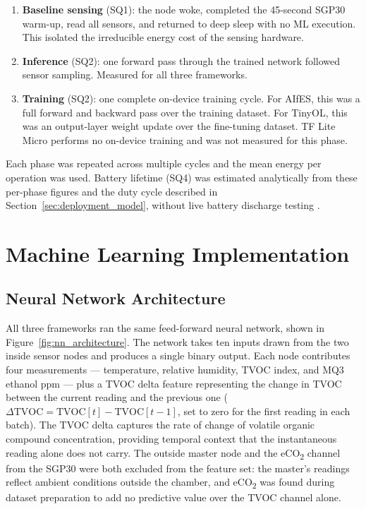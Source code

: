 \begin{enumerate}
    \item \textbf{Baseline sensing} (SQ1): the node woke, completed the 45-second SGP30 warm-up, read all sensors, and returned to deep sleep with no ML execution. This isolated the irreducible energy cost of the sensing hardware.
    \item \textbf{Inference} (SQ2): one forward pass through the trained network followed sensor sampling. Measured for all three frameworks.
    \item \textbf{Training} (SQ2): one complete on-device training cycle. For AIfES, this was a full forward and backward pass over the training dataset. For TinyOL, this was an output-layer weight update over the fine-tuning dataset. TF Lite Micro performs no on-device training and was not measured for this phase.
\end{enumerate}

Each phase was repeated across multiple cycles and the mean energy per operation was used. Battery lifetime (SQ4) was estimated analytically from these per-phase figures and the duty cycle described in Section~\ref{sec:deployment_model}, without live battery discharge testing \cite{Rodrigues2017}.

\section{Machine Learning Implementation}

\subsection{Neural Network Architecture}

All three frameworks ran the same feed-forward neural network, shown in Figure~\ref{fig:nn_architecture}. The network takes ten inputs drawn from the two inside sensor nodes and produces a single binary output. Each node contributes four measurements --- temperature, relative humidity, TVOC index, and MQ3 ethanol ppm --- plus a TVOC delta feature representing the change in TVOC between the current reading and the previous one ($\Delta\text{TVOC} = \text{TVOC}[t] - \text{TVOC}[t-1]$, set to zero for the first reading in each batch). The TVOC delta captures the rate of change of volatile organic compound concentration, providing temporal context that the instantaneous reading alone does not carry. The outside master node and the eCO\textsubscript{2} channel from the SGP30 were both excluded from the feature set: the master's readings reflect ambient conditions outside the chamber, and eCO\textsubscript{2} was found during dataset preparation to add no predictive value over the TVOC channel alone.

